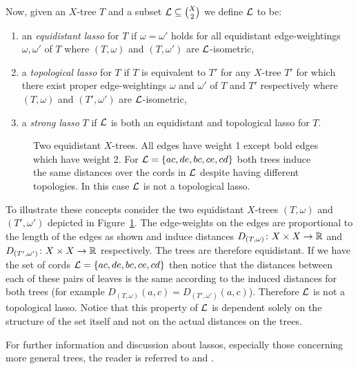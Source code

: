 Now, given an $X$-tree $T$ and a subset ${\mathcal L} \subseteq {X \choose 2}$ we
define ${\mathcal L}$ to be:
\begin{enumerate}[label=(\roman*)]
\item an \textit{equidistant lasso} for $T$ if $\omega = \omega'$ holds for
  all equidistant edge-weightings $\omega,\omega'$ of $T$ where $(T,\omega)$
  and $(T,\omega')$ are ${\mathcal L}$-isometric,
\item a \textit{topological lasso} for $T$ if $T$ is equivalent to $T'$ for
  any $X$-tree $T'$ for which there exist proper edge-weightings $\omega$ and
  $\omega'$ of $T$ and $T'$ respectively where $(T,\omega)$ and $(T',\omega')$
  are ${\mathcal L}$-isometric,
\item a \textit{strong lasso} $T$ if ${\mathcal L}$ is both an equidistant and
  topological lasso for $T$.
\end{enumerate}

\begin{figure}
\begin{center}

\end{center}
\caption{Two equidistant $X$-trees.  All edges have weight 1 except bold edges
  which have weight 2.  For ${\mathcal L}=\{ac,de,bc,ce,cd\}$ both trees induce the
  same distances over the cords in ${\mathcal L}$ despite having different topologies.
  In this case ${\mathcal L}$ is not a topological lasso.}
\label{fig:lasso-example}
\end{figure}

To illustrate these concepts consider the two equidistant $X$-trees
$(T,\omega)$ and $(T',\omega')$ depicted in Figure~\ref{fig:lasso-example}.
The edge-weights on the edges are proportional to the length of the edges as
shown and induce distances $D_{(T,\omega)} \colon X \times X \to {\mathbb R}$ and
$D_{(T',\omega')} \colon X \times X \to {\mathbb R}$ respectively.  The trees are
therefore equidistant.  If we have the set of cords ${\mathcal L}=\{ac,de,bc,ce,cd\}$
then notice that the distances between each of these pairs of leaves is the
same according to the induced distances for both trees (for example
$D_{(T,\omega)}(a,c) = D_{(T',\omega')}(a,c)$).  Therefore ${\mathcal L}$ is not a
topological lasso.  Notice that this property of ${\mathcal L}$ is dependent solely on
the structure of the set itself and not on the actual distances on the trees.

For further information and discussion about lassos, especially those
concerning more general trees, the reader is referred to
\cite{dress11lassoing} and \cite{huber2014tree}.

